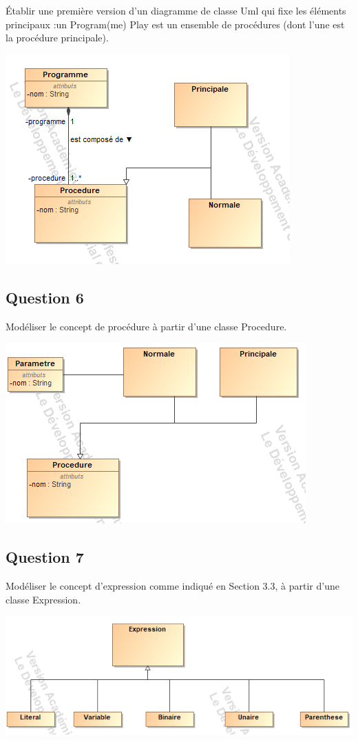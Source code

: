 \documentclass[11pt]{article}
\begin{document}
Établir une première version d'un diagramme de classe Uml qui fixe les éléments principaux :un Program(me) Play est un ensemble de procédures (dont l'une est la procédure principale).

 \includegraphics[scale=0.5]{Play_Q1.png}

\subsection{Question 6}

Modéliser le concept de procédure à partir d'une classe Procedure.

 \includegraphics[scale=0.5]{Play_Procedure.png}

\subsection{Question 7}

Modéliser le concept d'expression comme indiqué en Section 3.3, à partir d'une classe Expression.

 \includegraphics[scale=0.5]{Play_Expression.png}
\end{document}
